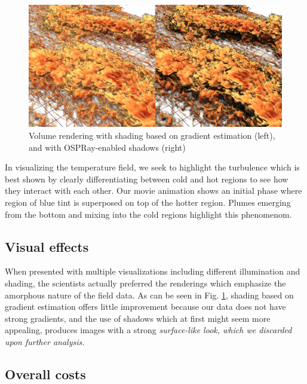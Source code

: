 \documentclass[final,5p,times,twocolumn]{elsarticle}
\begin{document}
\begin{figure}
	\centering
	\includegraphics[width=\linewidth]{fig2montage}%
	\caption{\label{fig:shadings} Volume rendering with shading based on gradient
estimation (left), and with OSPRay-enabled shadows (right)}
\end{figure}

In visualizing the temperature field, we seek to highlight the turbulence which
is best shown by clearly differentiating between cold and hot regions to see how
they interact with each other. Our movie animation shows an initial phase where
region of blue tint is superposed on top of the hotter region. Plumes emerging
from the bottom and mixing into the cold regions highlight this phenomenom.

\subsection{Visual effects}

When presented with multiple visualizations including different illumination and
shading, the scientists actually preferred the renderings which emphasize the
amorphous nature of the field data. As can be seen in Fig. \ref{fig:shadings},
shading based on gradient estimation offers little improvement because our data
does not have strong gradients, and the use of shadows which at first might seem
more appealing, produces images with a strong \it{surface-like} \rm look, which
we discarded upon further analysis.

\subsection{Overall costs}
\end{document}
